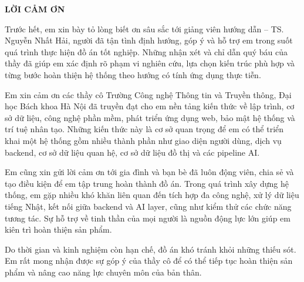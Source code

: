 \documentclass[../DoAn.tex]{subfiles}
\begin{document}
\begin{center}
    \Large{\textbf{LỜI CẢM ƠN}}\\
\end{center}
\vspace{1cm}

Trước hết, em xin bày tỏ lòng biết ơn sâu sắc tới giảng viên hướng dẫn -- TS. Nguyễn Nhất Hải, người đã tận tình định hướng, góp ý và hỗ trợ em trong suốt quá trình thực hiện đồ án tốt nghiệp. Những nhận xét và chỉ dẫn quý báu của thầy đã giúp em xác định rõ phạm vi nghiên cứu, lựa chọn kiến trúc phù hợp và từng bước hoàn thiện hệ thống theo hướng có tính ứng dụng thực tiễn.

Em xin cảm ơn các thầy cô Trường Công nghệ Thông tin và Truyền thông, Đại học Bách khoa Hà Nội đã truyền đạt cho em nền tảng kiến thức về lập trình, cơ sở dữ liệu, công nghệ phần mềm, phát triển ứng dụng web, bảo mật hệ thống và trí tuệ nhân tạo. Những kiến thức này là cơ sở quan trọng để em có thể triển khai một hệ thống gồm nhiều thành phần như giao diện người dùng, dịch vụ backend, cơ sở dữ liệu quan hệ, cơ sở dữ liệu đồ thị và các pipeline AI.

Em cũng xin gửi lời cảm ơn tới gia đình và bạn bè đã luôn động viên, chia sẻ và tạo điều kiện để em tập trung hoàn thành đồ án. Trong quá trình xây dựng hệ thống, em gặp nhiều khó khăn liên quan đến tích hợp đa công nghệ, xử lý dữ liệu tiếng Nhật, kết nối giữa backend và AI layer, cũng như kiểm thử các chức năng tương tác. Sự hỗ trợ về tinh thần của mọi người là nguồn động lực lớn giúp em kiên trì hoàn thiện sản phẩm.

Do thời gian và kinh nghiệm còn hạn chế, đồ án khó tránh khỏi những thiếu sót. Em rất mong nhận được sự góp ý của thầy cô để có thể tiếp tục hoàn thiện sản phẩm và nâng cao năng lực chuyên môn của bản thân.
\end{document}
